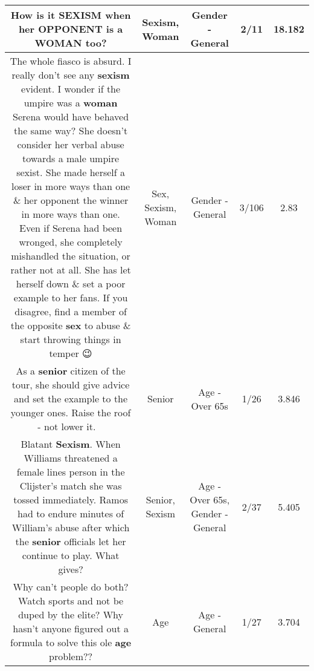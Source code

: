 \documentclass[11pt]{article}
\newlength\mylength
\begin{document}
\begin{center}
\begin{longtable}{|C{.65\mylength}|C{.30\mylength}|C{.12\mylength}|C{.12\mylength}|C{.12\mylength}|}
  \small How is it \textbf{SEXISM} when her OPPONENT is a \textbf{WOMAN} too?\normalsize   & Sexism, Woman & Gender - General & 2/11 & 18.182 \\  \hline
  \small The whole fiasco is absurd. I really don't see any \textbf{sexism} evident. I wonder if the umpire was a \textbf{woman} Serena would have behaved the same way? She doesn't consider her verbal abuse towards a male umpire sexist. She made herself a loser in more ways than one \& her opponent the winner in more ways than one. Even if Serena had been wronged, she completely mishandled the situation, or rather not at all. She has let herself down \& set a poor example to her fans. If you disagree, find a member of the opposite \textbf{sex} to abuse \& start throwing things in temper 😉\normalsize   & Sex, Sexism, Woman & Gender - General & 3/106 & 2.83 \\  \hline
  \small As a \textbf{senior} citizen of the tour, she should give advice and set the example to the younger ones. Raise the roof - not lower it.🤔🤔🤔\normalsize   & Senior & Age - Over 65s & 1/26 & 3.846 \\  \hline
  \small Blatant \textbf{Sexism}.  When Williams threatened a female lines person in the Clijster's match she was tossed immediately. Ramos had to endure minutes of William's abuse after which the \textbf{senior} officials let her continue to play. What gives?\normalsize   & Senior, Sexism & Age - Over 65s, Gender - General & 2/37 & 5.405 \\  \hline
  \small Why can't people do both? Watch sports and not be duped by the elite?  Why hasn't anyone figured out a formula to solve this ole \textbf{age} problem??\normalsize   & Age & Age - General & 1/27 & 3.704 \\  \hline

\end{longtable}
\end{center}
\end{document}
